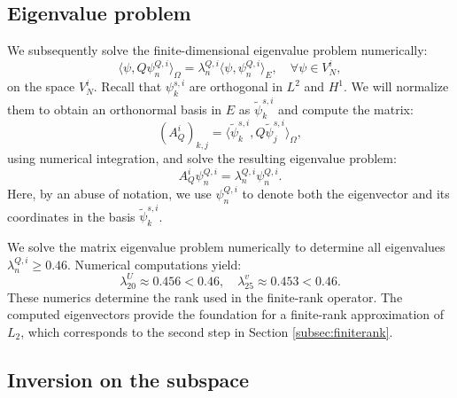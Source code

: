 \documentclass[11pt,a4paper]{article}
\numberwithin{equation}{section}
\begin{document}
\subsection{Eigenvalue problem}\label{sec:Q eig}

We subsequently solve the finite-dimensional eigenvalue problem numerically:
\[ \langle \psi, Q \psi_n^{Q, i} \rangle_{\Omega} = \lambda^{Q, i}_n  \langle
   \psi, \psi_n^{Q, i} \rangle_E, \quad \forall \psi \in V_N^i , \]
on the space $V_N^i$. Recall that $\psi_k^{s, i}$ are orthogonal in $L^2$ and
$H^1$. We will normalize them to obtain an orthonormal basis in $E$ as
$\widetilde{\psi}_k^{s, i}$ and compute the matrix:
\begin{equation}
  (A_Q^i)_{k, j} = \langle \widetilde{\psi}_k^{s, i}, Q \widetilde{\psi}_j^{s, i}
  \rangle_{\Omega}, \label{def:aq}
\end{equation}
using numerical integration, and solve the resulting eigenvalue problem:
\[ A_Q^i \psi^{Q, i}_n = \lambda^{Q, i}_n \psi^{Q, i}_n . \]
Here, by an abuse of notation, we use $\psi^{Q, i}_n$ to denote both the
eigenvector and its coordinates in the basis $\widetilde{\psi}_k^{s, i}$.

We solve the matrix eigenvalue problem numerically to determine all
eigenvalues $\lambda^{Q, i}_n \geqslant 0.46$. Numerical computations yield:
\[ \lambda^U_{20} \approx 0.456 < 0.46, \quad \lambda^v_{25} \approx 0.453 <
   0.46. \]
These numerics determine the rank used in the finite-rank operator. The
computed eigenvectors provide the foundation for a finite-rank approximation
of $L_2$, which corresponds to the second step in Section
\ref{subsec:finiterank}.

\subsection{Inversion on the subspace}\label{sec:inv L2}
\end{document}

